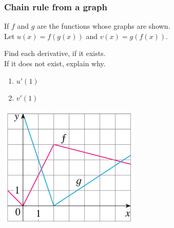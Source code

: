 \documentclass[14pt]{beamer}
\begin{document}
\begin{frame}
	\frametitle{Chain rule from a graph}

	If $f$ and $g$ are the functions whose graphs are shown. \\ Let $u(x)=f(g(x))$
	and $v(x)=g(f(x))$. \\
	\medskip

	Find each derivative, if it exists. \\ If it does not exist, explain why.

	\begin{enumerate}
		\item $u'(1)$

		\item $v'(1)$
	\end{enumerate}
	\vspace{-1cm}

	\begin{center}
		\includegraphics[width=0.5\textwidth]{G10}
	\end{center}
\end{frame}
\end{document}
